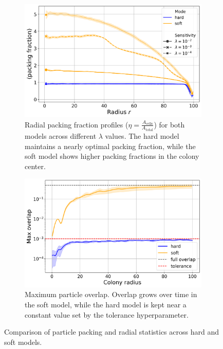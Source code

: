 \documentclass[conference]{IEEEtran}
\begin{document}
\begin{figure}[H]
    \begin{subfigure}[b]{\linewidth}
        \centering
        \includegraphics[width=\linewidth]{figures/comparison_plots/combined_radial_packing_fraction.png}
        \caption{Radial packing fraction profiles ($\eta = \frac{A_{\text{cells}}}{A_{\text{total}}}$) for both models across different $\lambda$ values. The hard model maintains a nearly optimal packing fraction, while the soft model shows higher packing fractions in the colony center.}
        \label{fig:radial_distribution_packing_fraction}
    \end{subfigure}

    \begin{subfigure}[b]{\linewidth}
        \centering
        \includegraphics[width=\linewidth]{figures/comparison_plots/combined_colony_radius_vs_max_overlap_with_lines.png}
        \caption{Maximum particle overlap. Overlap grows over time in the soft model, while the hard model is kept near a constant value set by the tolerance hyperparameter.}
        \label{fig:max_overlap_simulation}
    \end{subfigure}

    \caption{Comparison of particle packing and radial statistics across hard and soft models.}
    \label{fig:combined_packing_analysis}
\end{figure}
\end{document}
